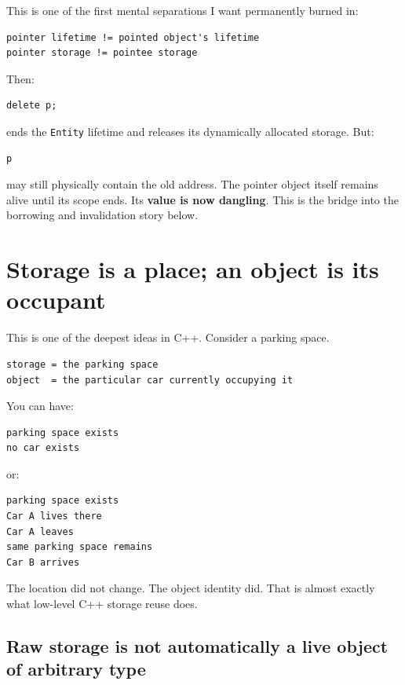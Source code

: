 This is one of the first mental separations I want permanently burned in:

\begin{verbatim}
pointer lifetime != pointed object's lifetime
pointer storage != pointee storage
\end{verbatim}

Then:

\begin{verbatim}
delete p;
\end{verbatim}

ends the \texttt{Entity} lifetime and releases its dynamically allocated storage. But:

\begin{verbatim}
p
\end{verbatim}

may still physically contain the old address. The pointer object itself remains alive until its scope ends. Its \textbf{value is now dangling}. This is the bridge into the borrowing and invalidation story below.

\section{Storage is a place; an object is its occupant}\label{05-engine-i-ch002-storage-is-a-place-an-object-is-its-occupant}

This is one of the deepest ideas in C++. Consider a parking space.

\begin{verbatim}
storage = the parking space
object  = the particular car currently occupying it
\end{verbatim}

You can have:

\begin{verbatim}
parking space exists
no car exists
\end{verbatim}

or:

\begin{verbatim}
parking space exists
Car A lives there
Car A leaves
same parking space remains
Car B arrives
\end{verbatim}

The location did not change. The object identity did. That is almost exactly what low-level C++ storage reuse does.

\subsection{Raw storage is not automatically a live object of arbitrary type}\label{05-engine-i-ch002-raw-storage-is-not-automatically-a-live-object-of-arbitrary-type}

